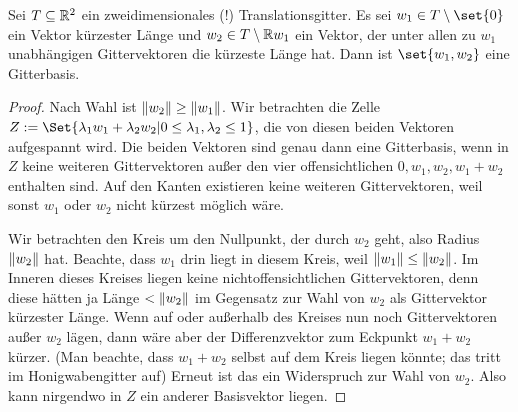 \begin{lemma}\label{kristalle:gitterbasen_2D_kuerzeste_vektoren}
Sei $T\subseteq\mathbb{R}^2$ ein zweidimensionales (!) Translationsgitter. Es sei $w_1\in T\setminus\set{0}$ ein Vektor kürzester Länge und $w_2\in T \setminus \mathbb{R} w_1$ ein Vektor, der unter allen zu $w_1$ unabhängigen Gittervektoren die kürzeste Länge hat. Dann ist $\set{w_1,w_2}$ eine Gitterbasis.
\end{lemma}
\begin{proof}
Nach Wahl ist $\lVert w_2\rVert\geq\lVert w_1\rVert$. Wir betrachten die Zelle $Z:=\Set{\lambda_1 w_1+ \lambda_2 w_2 | 0\leq \lambda_1,\lambda_2\leq 1}$, die von diesen beiden Vektoren aufgespannt wird. Die beiden Vektoren sind genau dann eine Gitterbasis, wenn in $Z$ keine weiteren Gittervektoren außer den vier offensichtlichen $0,w_1,w_2,w_1+w_2$ enthalten sind. Auf den Kanten existieren keine weiteren Gittervektoren, weil sonst $w_1$ oder $w_2$ nicht kürzest möglich wäre.

Wir betrachten den Kreis um den Nullpunkt, der durch $w_2$ geht, also Radius $\lVert w_2\rVert$ hat. Beachte, dass $w_1$ drin liegt in diesem Kreis, weil $\lVert w_1\rVert\leq \lVert w_2\rVert$. Im Inneren dieses Kreises liegen keine nichtoffensichtlichen Gittervektoren, denn diese hätten ja Länge $<\lVert w_2\rVert$ im Gegensatz zur Wahl von $w_2$ als Gittervektor kürzester Länge. Wenn auf oder außerhalb des Kreises nun noch Gittervektoren außer $w_2$ lägen, dann wäre aber der Differenzvektor zum Eckpunkt $w_1+w_2$ kürzer. (Man beachte, dass $w_1+w_2$ selbst auf dem Kreis liegen könnte; das tritt im Honigwabengitter auf) Erneut ist das ein Widerspruch zur Wahl von $w_2$. Also kann nirgendwo in $Z$ ein anderer Basisvektor liegen.
\end{proof}

